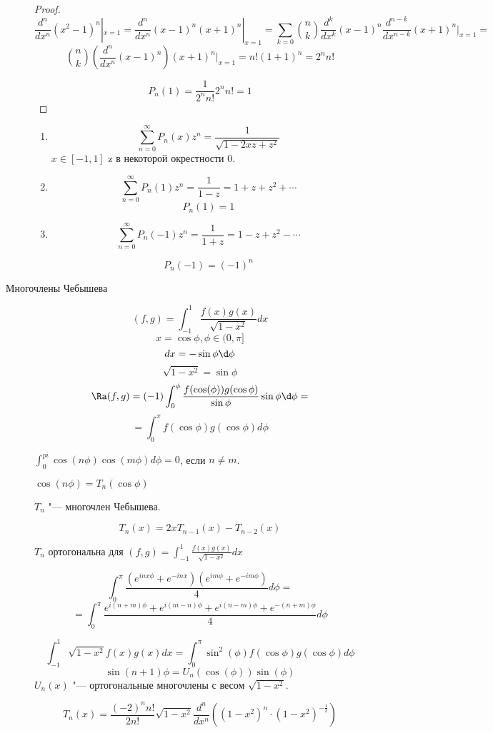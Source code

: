\begin{description}
\begin{proof}
    $$\frac{d^n}{dx^n}(x^2 - 1)^n|_{x = 1} = \frac{d^n}{dx^n}(x - 1)^n(x + 1)^n|_{x = 1} = \sum_{k = 0}\binom{n}{k}\frac{d^k}{dx^k}(x - 1)^n\frac{d^{n - k}}{dx^{n - k}}(x + 1)^n|_{x = 1} = $$
    $$ \binom{n}{k}(\frac{d^n}{dx^n}(x - 1)^n)(x + 1)^n|_{x = 1} = n!(1 + 1)^n = 2^nn!$$

    $$P_n(1) = \frac{1}{2^nn!}2^nn! = 1$$
    \end{proof}

    \begin{theorem}
    \begin{enumerate}
    \item
    $$\sum_{n = 0}^{\infty}P_n(x)z^n = \frac{1}{\sqrt{1 - 2xz + z^2}}$$
    $x \in [-1,1]$ z в некоторой окрестности 0.
    \item
    $$\sum_{n = 0}^{\infty}P_n(1)z^n = \frac{1}{1 - z} = 1 + z + z^2 + \cdots $$
    $$P_n(1) = 1$$
    \item
    $$\sum_{n = 0}^{\infty}P_n(-1)z^n = \frac{1}{1 + z} = 1 - z + z^2 - \cdots$$

    $$P_n(-1) = (-1)^n $$
    \end{enumerate}
    \end{theorem}
\item[Многочлены Чебышева]
$$(f, g) = \int_{-1}^{1} \frac{f(x)g(x)}{\sqrt{1 - x^2}}dx$$
$$x = \cos \phi, \phi \in (0, \pi]$$
$$dx = -\sin \phi \d\phi $$
$$\sqrt{1 - x^2} = \sin \phi$$
$$\Ra (f, g) = (-1)\int_{0}^{\phi}\frac{f(\cos(\phi))g(\cos \phi)}{\sin \phi}\sin \phi \d \phi = $$
$$= \int_{0}^{\pi}f(\cos \phi)g(\cos \phi) d \phi$$

$\int_{0}^{pi}\cos(n\phi)\cos(m\phi) d \phi = 0$, если $n \ne m$.

$\cos(n \phi) = T_n(\cos \phi)$

$T_n$ "--- многочлен Чебышева. 

$$T_n(x) = 2xT_{n - 1}(x) - T_{n - 2}(x)$$

$T_n$ ортогональна для $(f, g) = \int_{-1}^{1}\frac{f(x)g(x)}{\sqrt{1 - x^2}}dx$

$$\int_{0}^{\pi}\frac{(e^{inx\phi} + e^{-inx})(e^{im\phi} + e^{-im\phi})}{4} d\phi =  $$
$$= \int_{0}^{\pi}\frac{e^{i(n + m)\phi} + e^{i(m - n) \phi} + e^{i(n - m) \phi} + e^{-(n + m)\phi}}{4}d\phi $$

$$\int_{-1}^{1}\sqrt{1 - x^2}f(x)g(x)dx = \int_{0}^{\pi}\sin^2(\phi)f(\cos \phi)g(\cos \phi) d \phi$$
$$\sin(n + 1)\phi= U_n(\cos(\phi))\sin(\phi)$$
$U_n(x)$ "--- ортогональные многочлены с весом $\sqrt{1 - x^2}$.

$$T_n(x) = \frac{(-2)^nn!}{2n!}\sqrt{1 - x^2}\frac{d^n}{dx^n}((1 - x^2)^n \cdot (1 - x^2)^{-\frac{1}{2}}) $$


\end{description}
